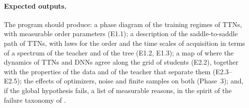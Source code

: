 \documentclass[11pt]{article}
\theoremstyle{definition}
\numberwithin{equation}{section}
\begin{document}
\paragraph{Expected outputs.}
The program should produce: a phase diagram of the training regimes of TTNs, with measurable order parameters (E1.1); a description of the saddle-to-saddle path of TTNs, with laws for the order and the time scales of acquisition in terms of a spectrum of the teacher and of the tree (E1.2, E1.3); a map of where the dynamics of TTNs and DNNs agree along the grid of students (E2.2), together with the properties of the data and of the teacher that separate them (E2.3--E2.5); the effects of optimizers, noise and finite samples on both (Phase~3); and, if the global hypothesis fails, a list of measurable reasons, in the spirit of the failure taxonomy of \citet[Section~11]{hfl_surrogate}.
\end{document}
